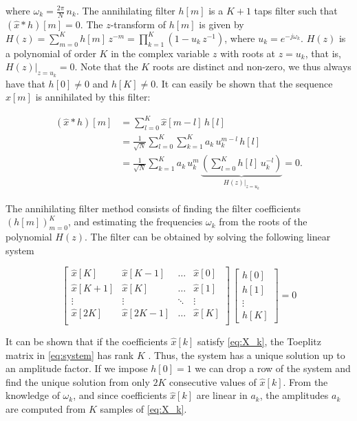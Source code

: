 \documentclass{article}
\def\hx{\hat{x}}
\begin{document}
\noindent
where $\omega_k = \tfrac{2\pi}{N}\,n_k$. The annihilating filter $h[m]$ is a $K+1$ taps
filter such that $(\hx * h)[m] = 0$. The $z$-transform of $h[m]$ is given by
$H(z) = \sum_{m=0}^{K} h[m] \, z^{-m} = \prod_{k=1}^{K} \left(1-u_k \, z^{-1}\right)$,
where $u_k = e^{-j\omega_k}$.
$H(z)$ is a polynomial of order $K$ in the complex variable $z$ with roots at $z=u_k$, 
that is, $H(z)\vert_{z=u_k}=0$. Note that the $K$ roots are distinct and non-zero, we thus 
always have that $h[0] \neq 0$ and $h[K] \neq 0$.
It can easily be shown that the sequence $\hx[m]$ is annihilated by this filter:

\begin{equation}
\begin{aligned}
(\hx * h)[m] 
& = \sum_{l=0}^{K} \hx[m-l] \, h[l] \\
& = \tfrac{1}{\sqrt{N}} \sum_{l=0}^{K} \sum_{k=1}^K a_k \, u_k^{m-l} \, h[l] \\
& = \tfrac{1}{\sqrt{N}} \sum_{k=1}^{K} a_k \, u_k^{m} 
    \, \underbrace{\left(\sum_{l=0}^{K} h[l] \, u_k^{-l}\right)}_{H(z)\vert_{z=u_k}}
  = 0.
\end{aligned}
\end{equation}
 
 The annihilating filter method consists of finding the filter coefficients 
 $\left(h[m]\right)_{m=0}^K$, and estimating the frequencies $\omega_k$ from 
 the roots of the polynomial $H(z)$. The filter can be obtained by solving the 
 following linear system

\begin{equation}
\begin{bmatrix}
\hx[K] & \hx[K-1] & \ldots & \hx[0]\\
\hx[K+1] & \hx[K] & \ldots & \hx[1]\\
\vdots & \vdots & \ddots & \vdots\\
\hx[2K] & \hx[2K-1] & \ldots & \hx[K]\\
\end{bmatrix}
\,
\begin{bmatrix}
h[0]\\ h[1]\\ \vdots\\ h[K]
\end{bmatrix}
= 0
\label{eq:system}
\end{equation}

It can be shown that if the coefficients $\hx[k]$ satisfy \eqref{eq:X_k},
the Toeplitz matrix in \eqref{eq:system} has rank $K$ \cite{maravic2005}. Thus, the system
has a unique solution up to an amplitude factor. If we impose $h[0]=1$ we can 
drop a row of the system and find the unique solution from only $2K$ 
consecutive values of $\hx[k]$. 
From the knowledge of $\omega_k$, and since coefficients $\hx[k]$ are linear in $a_k$,  
the amplitudes $a_k$ are computed from $K$ samples of \eqref{eq:X_k}.
\end{document}
